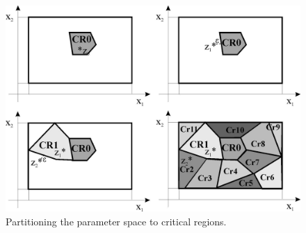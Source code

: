     \begin{figure}[!ht]
        \centering
        \includegraphics[width=.9\textwidth]{EMPC_PNG_Pics/criticalregions.jpg}
        \caption{Partitioning the parameter space to critical regions.}
        \label{BASICCSR:fig:Crit}
    \end{figure}
    
    
    
    
    

